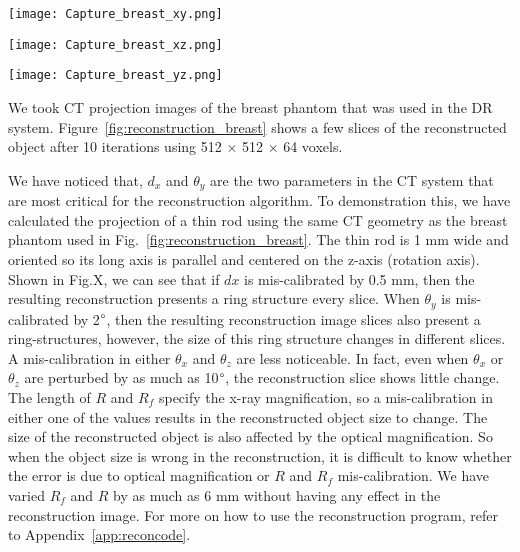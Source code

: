 \begin{figure*}
	\begin{minipage}{0.3\linewidth}
		\texttt{[image: Capture\_breast\_xy.png]}
		\subcaption{}
	\end{minipage}
	\vspace{0.3cm}
	\begin{minipage}{0.3\linewidth}
		\texttt{[image: Capture\_breast\_xz.png]}
		\subcaption{}
	\end{minipage}
	\vspace{0.3cm}
	\begin{minipage}{0.3\linewidth}
		\texttt{[image: Capture\_breast\_yz.png]}
		\subcaption{}
	\end{minipage}
\caption{A slice of the reconstructed phantom in the (a) x-y plane (b) x-z plane, and (c) y-z plane, calculated using 512 $\times$ 512 $\times$ 64 voxels after 10 iterations.}
\label{fig:reconstruction_breast}
\end{figure*}

We took CT projection images of the breast phantom that was used in the DR system.  Figure~\ref{fig:reconstruction_breast} shows a few slices of the reconstructed object after 10 iterations using 512 $\times$ 512 $\times$ 64 voxels.  

We have noticed that, $d_x$ and $\theta_y$ are the two parameters in the CT system that are most critical for the reconstruction algorithm.  To demonstration this, we have calculated the projection of a thin rod using the same CT geometry as the breast phantom used in Fig.~\ref{fig:reconstruction_breast}.  The thin rod is 1 mm wide and oriented so its long axis is parallel and centered on the z-axis (rotation axis).  Shown in Fig.X, we can see that if $dx$ is mis-calibrated by 0.5 mm, then the resulting reconstruction presents a ring structure every slice.  When $\theta_y$ is mis-calibrated by 2$\degree$, then the resulting reconstruction image slices also present a ring-structures, however, the size of this ring structure changes in different slices.  A mis-calibration in either $\theta_x$ and $\theta_z$ are less noticeable.  In fact, even when $\theta_x$ or $\theta_z$ are perturbed by as much as 10$\degree$, the reconstruction slice shows little change.  The length of $R$ and $R_f$ specify the x-ray magnification, so a mis-calibration in either one of the values results in the reconstructed object size to change.  The size of the reconstructed object is also affected by the optical magnification.  So when the object size is wrong in the reconstruction, it is difficult to know whether the error is due to optical magnification or $R$ and $R_f$ mis-calibration.  We have varied $R_f$ and $R$ by as much as 6 mm without having any effect in the reconstruction image.  For more on how to use the reconstruction program, refer to Appendix~\ref{app:reconcode}. 

